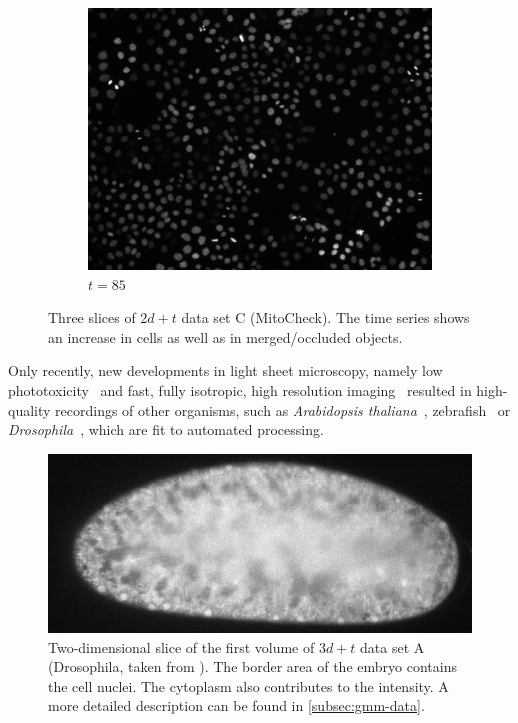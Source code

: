 \begin{figure}[h]
\begin{subfigure}{0.32\textwidth}
        \centering
        \includegraphics[width=\textwidth]{images/gmm/data/C/85.png}
        \caption{$t=85$}
        \label{fig:gmm-data-c-late}
    \end{subfigure}
    \hfill
    \caption[An excerpt of data set C]{Three slices of $2d+t$ data set C (MitoCheck). The time series shows an increase
        in cells as well as in merged/occluded objects.}
    \label{fig:gmm-data-c-three-slices}
\end{figure}

Only recently, new developments in light sheet microscopy, namely low
phototoxicity~\citep{jemielita_12_comparing} and fast, fully isotropic, high resolution
imaging~\citep{santi_11_light,weber_11_light,keller_12_light} resulted in high-quality recordings of
other organisms, such as \emph{Arabidopsis thaliana}~\citep{maizel_11_high},
zebrafish~\citep{keller_08_reconstruction} or
\emph{Drosophila}~\citep{keller_10_fast,krzic_12_multiview}, which are fit to automated processing.


\begin{figure}
    \centering
    \includegraphics[width=\textwidth]{images/gmm/data/A/dataA.png}
    \caption[Two-dimensional slice of the first volume of data set A]{Two-dimensional slice of the
        first volume of $3d+t$ data set A (Drosophila, taken from \citet[43]{kausler_13_tracking}). The
        border area of the embryo contains the cell nuclei. The cytoplasm also contributes to the
        intensity. A more detailed description can be found in \cref{subsec:gmm-data}.}
    \label{fig:gmm-data-a}
\end{figure}

